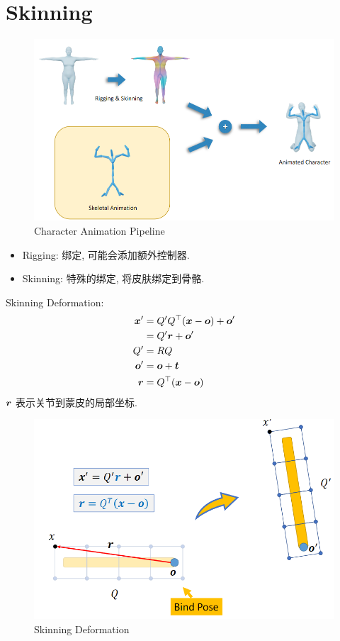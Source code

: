 \newpage
\section{Skinning}

\begin{figure}[!htb]
    \centering
    \includegraphics[width=0.618\linewidth]{pic/1057/Character Animation Pipeline}
    \caption{Character Animation Pipeline}
\end{figure}


\begin{itemize}
    \item Rigging: 绑定, 可能会添加额外控制器.
    \item Skinning: 特殊的绑定, 将皮肤绑定到骨骼.
\end{itemize}

Skinning Deformation: 
\begin{align*}
    {\bm{x}}' &= Q'Q^\top ({\bm{x}} - {\bm{o}}) + {\bm{o}}'\\
    &= Q' {\bm{r}} + {\bm{o}}'\\
    Q' &= RQ\\
    {\bm{o}}' &= {\bm{o}} + {\bm{t}}\\
    {\bm{r}} &= Q^\top ({\bm{x}} - {\bm{o}})
\end{align*}
${\bm{r}}$ 表示关节到蒙皮的局部坐标. 

\begin{figure}[!htb]
    \centering
    \includegraphics[width=0.618\linewidth]{pic/1057/Skinning Deformation}
    \caption{Skinning Deformation}
\end{figure}

